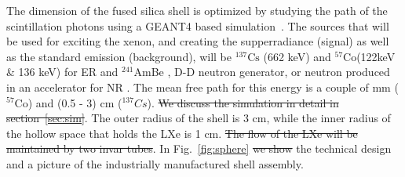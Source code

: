 The dimension of the fused silica shell is optimized by studying the path of the scintillation photons using a GEANT4 based simulation~\cite{Agostinelli:2002hh}. The sources that will be used for exciting the xenon, and creating the supperradiance (signal) as well as the standard emission (background), will be $^{137} \mathrm{Cs}$ (662 keV) and $^{57} \mathrm{Co}$(122keV \& 136 keV) for ER and $^{241}$AmBe , D-D neutron generator, or neutron produced in an accelerator for NR . The mean free path for this energy is a couple of mm ($^{57} \mathrm{Co}$) and (0.5 - 3) cm ($^{137} Cs$).  \sout{We discuss the simulation in detail in section~\ref{sec:sim}}. 
The outer radius of the shell is 3 cm, while the inner radius of the hollow space that holds the LXe is 1 cm. \sout{The flow of the LXe will be maintained by two invar tubes}.  In Fig.~\ref{fig:sphere} \sout{we show} 
the technical design and a picture of the industrially manufactured shell assembly. 



